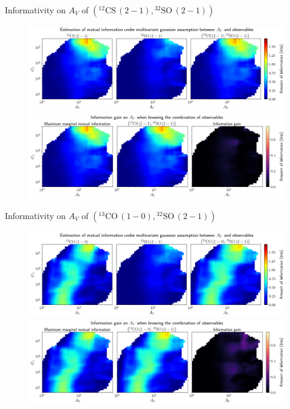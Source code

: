\documentclass{beamer}
\begin{document}
\begin{frame}{Informativity on $A_V$ of $\left(\mathrm{^{12}CS\,(2-1)},\mathrm{^{32}SO\,(2-1)}\right)$}
    \begin{figure}
        \centering
        \includegraphics[width=0.95\linewidth]{../linearinfo/av__12cs21_32so21_linearinfo.png}
        \vfill
        \includegraphics[width=0.95\linewidth]{../linearinfo/av__12cs21_32so21_linearinfo_gain.png}
    \end{figure}
\end{frame}

\begin{frame}{Informativity on $A_V$ of $\left(\mathrm{^{13}CO\,(1-0)},\mathrm{^{32}SO\,(2-1)}\right)$}
    \begin{figure}
        \centering
        \includegraphics[width=0.95\linewidth]{../linearinfo/av__13co10_32so21_linearinfo.png}
        \vfill
        \includegraphics[width=0.95\linewidth]{../linearinfo/av__13co10_32so21_linearinfo_gain.png}
    \end{figure}
\end{frame}
\end{document}
